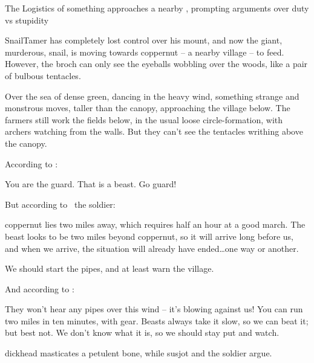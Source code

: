 
{The Logistics of }%
{something approaches a nearby , prompting arguments over duty vs stupidity}%

\Gls{SnailTamer} has completely lost control over his mount, and now the giant, murderous, snail, is moving towards \gls{coppernut} -- a nearby \gls{village} -- to feed.
However, the \gls{broch} can only see the eyeballs wobbling over the woods, like a pair of bulbous tentacles.

\begin{boxtext}
  Over the sea of dense green, dancing in the heavy wind, something strange and monstrous moves, taller than the canopy, approaching the \gls{village} below.
  The farmers still work the fields below, in the usual loose circle-formation, with archers watching from the walls.
  But they can't see the tentacles writhing above the canopy.
\end{boxtext}

According to :

\begin{speechtext}
  You are the \gls{guard}.
  That is a beast.
  Go guard!
\end{speechtext}

But according to \composeHumanName\ the \gls{soldier}:

\begin{speechtext}
  \Gls{coppernut} lies two miles away, which requires half an hour at a good march.
  The beast looks to be two miles beyond \gls{coppernut}, so it will arrive long before us, and when we arrive, the situation will already have ended\ldots one way or another.

  We should start the pipes, and at least warn the \gls{village}.
\end{speechtext}

And according to :

\null
\begin{speechtext}
  They won't hear any pipes over this wind -- it's blowing against us!
  You can run two miles in ten minutes, with gear.
  Beasts always take it slow, so we can beat it; but best not.
  We don't know what it is, so we should stay put and watch.
\end{speechtext}

\begin{boxtext}
  \Gls{dickhead} masticates a petulent bone, while \gls{susjot} and the \gls{soldier} argue.
\end{boxtext}

